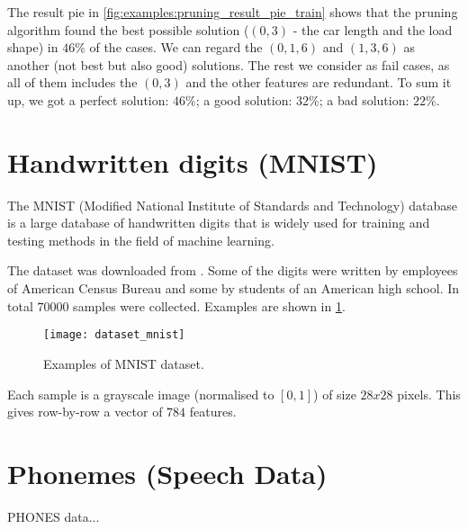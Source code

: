 The result pie in \cref{fig:examples:pruning_result_pie_train} shows that the pruning algorithm found the best possible solution ($ (0, 3) $ - the car length and the load shape) in $ 46\% $ of the cases. We can regard the $ (0, 1, 6) $ and $ (1, 3, 6) $ as another (not best but also good) solutions. The rest we consider as fail cases, as all of them includes the $ (0, 3) $ and the other features are redundant. To sum it up, we got a perfect solution: $ 46\% $; a good solution: $ 32\% $; a bad solution: $ 22\% $.

\section{Handwritten digits (MNIST)} \label{sec:dataset_mnist}
The MNIST (Modified National Institute of Standards and Technology) database \citep{wiki:mnist} is a large database of handwritten digits that is widely used for training and testing methods in the field of machine learning. 

The dataset was downloaded from \citep{online:mnist}. Some of the digits were written by employees of American Census Bureau \citep{online:census} and some by students of an American high school. In total $ 70000 $ samples were collected. Examples are shown in \cref{fig:examples:dataset_mnist}.

\begin{figure}[H]
\centering
\texttt{[image: dataset\_mnist]}
\caption{Examples of MNIST dataset.}
\label{fig:examples:dataset_mnist}
\end{figure}

Each sample is a grayscale image (normalised to $ [0, 1] $) of size $ 28x28 $ pixels. This gives row-by-row a vector of $ 784 $ features.

\section{Phonemes (Speech Data)} \label{sec:dataset_phonemes}
PHONES data...
